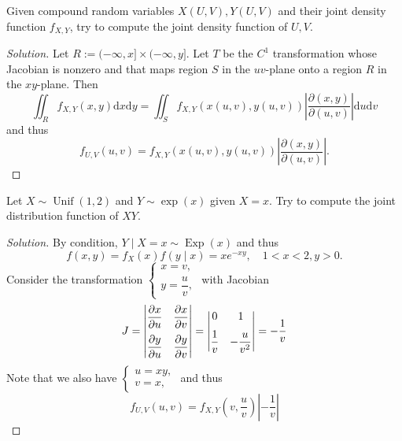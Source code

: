 \documentclass[11pt,singlecolumn, openany, citestyle=authoryear]{elegantbook}
\begin{document}
\begin{CJK}{UTF8}{gbsn}
\begin{exercise}\label{ex:ex3}
    Given compound random variables $X(U,V), Y(U,V)$ and their joint density function $f_{X,Y}$,
    try to compute the joint density function of $U,V$.
\end{exercise}
\begin{proof}[Solution]
    Let $R:=(-\infty,x] \times (-\infty,y]$.
    Let $T$ be the $C^1$ transformation
    whose Jacobian is nonzero and that maps region $S$ in the $uv$-plane onto a region 
    $R$ in the $xy$-plane. Then 
    $$
    \iint_R f_{X,Y}(x,y) \mathrm{d}x\mathrm{d}y = 
    \iint_S f_{X,Y}(x(u,v),y(u,v)) 
    \left|
            \frac{\partial (x,y)}{\partial (u,v)}
    \right|\mathrm{d}u \mathrm{d}v
    $$
    and thus 
    $$
    f_{U,V}(u,v)=f_{X,Y}(x(u,v),y(u,v))\left|
        \frac{\partial (x,y)}{\partial (u,v)}
    \right|.
    $$
\end{proof}
\begin{exercise}
    Let $X\sim \operatorname*{Unif}(1,2)$ and $Y\sim \operatorname*{exp}(x)$ given 
    $X=x$. Try to compute the joint distribution function of $XY$.
\end{exercise}
\begin{proof}[Solution]
    By condition, $Y\mid X=x \sim \operatorname*{Exp}(x)$ and thus 
    $$
    f(x,y)=f_X(x)f(y\mid x)=xe^{-xy},\quad 1<x<2,y>0.
    $$
    Consider the transformation $\begin{cases}
        x=v,\\
        y=\dfrac{u}{v},
    \end{cases}$
    with Jacobian
    $$J=
    \begin{vmatrix}
        \vspace{1.5ex}
        \dfrac{\partial x}{\partial u} & \dfrac{\partial x}{\partial v}\\
        \dfrac{\partial y}{\partial u} & \dfrac{\partial y}{\partial v}
    \end{vmatrix}=
    \begin{vmatrix}
        \vspace{1.5ex}
        0& 1 \\
        \dfrac{1}{v}& -\dfrac{u}{v^2}
    \end{vmatrix}=-\frac{1}{v}
    $$
    Note that we also have $\begin{cases}
        u=xy,\\
        v=x,
    \end{cases}$
    and thus 
    $$
    f_{U,V}(u,v)=f_{X,Y}\left(v,\dfrac{u}{v}\right)\left|-\frac{1}{v} \right|
$$
\end{proof}
\end{CJK}
\end{document}
